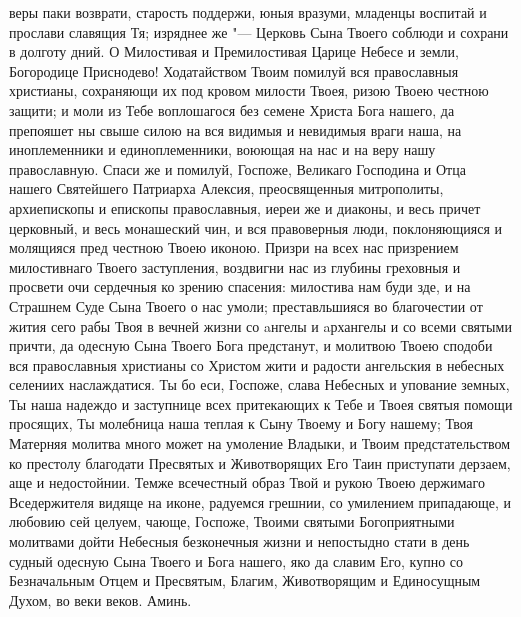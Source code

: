 \begin{mymulticols}
веры паки возврати, старость поддержи, юныя вразуми, младенцы воспитай и прослави славящия Тя; изряднее же "--- Церковь Сына Твоего соблюди и сохрани в долготу дний. О Милостивая и Премилостивая Царице Небесе и земли, Богородице Приснодево! Ходатайством Твоим помилуй вся православныя христианы, сохраняющи их под кровом милости Твоея, ризою Твоею честною защити; и моли из Тебе воплошагося без семене Христа Бога нашего, да препояшет ны свыше силою на вся видимыя и невидимыя враги наша, на иноплеменники и единоплеменники, воюющая на нас и на веру нашу православную. Спаси же и помилуй, Госпоже, Великаго Господина и Отца нашего Святейшего Патриарха Алексия, преосвященныя митрополиты, архиепископы и епископы православныя, иереи же и диаконы, и весь причет церковный, и весь монашеский чин, и вся правоверныя люди, поклоняющияся и молящияся пред честною Твоею иконою. Призри на всех нас призрением милостивнаго Твоего заступления, воздвигни нас из глубины греховныя и просвети очи сердечныя ко зрению спасения: милостива нам буди зде, и на Страшнем Суде Сына Твоего о нас умоли; преставльшияся во благочестии от жития сего рабы Твоя в вечней жизни со aнгелы и aрхангелы и со всеми святыми причти, да одесную Сына Твоего Бога предстанут, и молитвою Твоею сподоби вся православныя христианы со Христом жити и радости ангельския в небесных селениих наслаждатися. Ты бо еси, Госпоже, слава Небесных и упование земных, Ты наша надеждо и заступнице всех притекающих к Тебе и Твоея святыя помощи просящих, Ты молебница наша теплая к Сыну Твоему и Богу нашему; Твоя Матерняя молитва много может на умоление Владыки, и Твоим предстательством ко престолу благодати Пресвятых и Животворящих Его Таин приступати дерзаем, аще и недостойнии. Темже всечестный образ Твой и рукою Твоею держимаго Вседержителя видяще на иконе, радуемся грешнии, со умилением припадающе, и любовию сей целуем, чающе, Госпоже, Твоими святыми Богоприятными молитвами дойти Небесныя безконечныя жизни и непостыдно стати в день судный одесную Сына Твоего и Бога нашего, яко да славим Его, купно со Безначальным Отцем и Пресвятым, Благим, Животворящим и Единосущным Духом, во веки веков. Аминь.

\end{mymulticols}

\mychapterending

